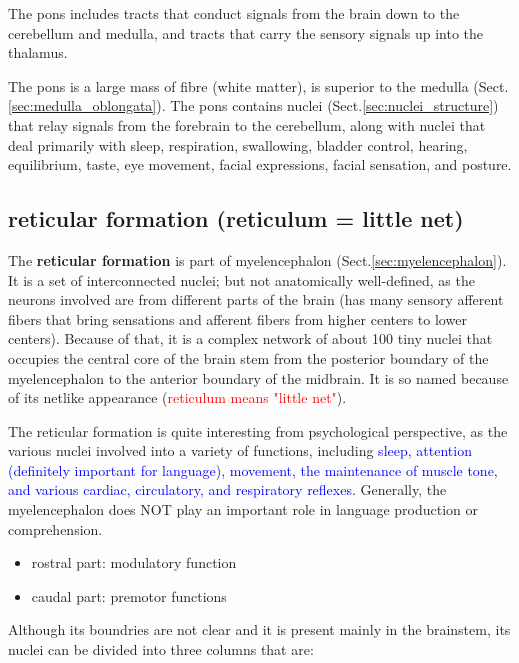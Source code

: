 The pons includes tracts that conduct signals from the brain down to the
cerebellum and medulla, and tracts that carry the sensory signals up into the
thalamus.

The pons is a large mass of fibre (white matter), is superior to the medulla
(Sect.\ref{sec:medulla_oblongata}).
The pons contains nuclei (Sect.\ref{sec:nuclei_structure}) that relay signals
from the forebrain to the cerebellum, along with nuclei that deal primarily with
sleep, respiration, swallowing, bladder control, hearing, equilibrium, taste,
eye movement, facial expressions, facial sensation, and posture.

\subsection{reticular formation (reticulum = little net)}
\label{sec:reticular-formation}

The {\bf reticular formation} is part of myelencephalon
(Sect.\ref{sec:myelencephalon}).  It is a set of interconnected nuclei; but not
anatomically well-defined, as the neurons involved are from different parts of
the brain (has many sensory afferent fibers that bring sensations and afferent
fibers from higher centers to lower centers). Because of that, it is a complex
network of about 100 tiny nuclei that occupies the central core of the brain
stem from the posterior boundary of the myelencephalon to the anterior boundary
of the midbrain. It is so named because of its netlike appearance
(\textcolor{red}{reticulum means "little net"}).

\begin{mdframed}
The reticular formation is quite interesting from psychological perspective, as
the various nuclei involved into a variety of functions, including
\textcolor{blue}{sleep, attention (definitely important for language), movement,
the maintenance of muscle tone, and various cardiac, circulatory, and
respiratory reflexes}. Generally, the myelencephalon does NOT play an important
role in language production or comprehension.

\begin{itemize}
  \item rostral part: modulatory function
  
  \item caudal part: premotor functions
\end{itemize}
\end{mdframed}

Although its boundries are not clear and it is present mainly in the
brainstem, its nuclei can be divided into three columns that are:

